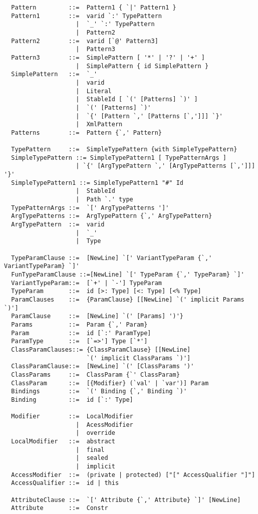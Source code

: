 \begin{lstlisting}
  Pattern         ::=  Pattern1 { `|' Pattern1 }
  Pattern1        ::=  varid `:' TypePattern
                    |  `_' `:' TypePattern
                    |  Pattern2
  Pattern2        ::=  varid [`@' Pattern3]
                    |  Pattern3
  Pattern3        ::=  SimplePattern [ '*' | '?' | '+' ]
                    |  SimplePattern { id SimplePattern }
  SimplePattern   ::=  `_'
                    |  varid
                    |  Literal
                    |  StableId [ `(' [Patterns] `)' ]
                    |  `(' [Patterns] `)'
                    |  `{' [Pattern `,' [Patterns [`,']]] `}'
                    |  XmlPattern
  Patterns        ::=  Pattern {`,' Pattern}

  TypePattern     ::=  SimpleTypePattern {with SimpleTypePattern}
  SimpleTypePattern ::= SimpleTypePattern1 [ TypePatternArgs ]
                    | `{' [ArgTypePattern `,' [ArgTypePatterns [`,']]] '}'
  SimpleTypePattern1 ::= SimpleTypePattern1 "#" Id
                    |  StableId 
                    |  Path `.' type 
  TypePatternArgs ::=  `[' ArgTypePatterns ']'
  ArgTypePatterns ::=  ArgTypePattern {`,' ArgTypePattern}
  ArgTypePattern  ::=  varid 
                    |  `_' 
                    |  Type

  TypeParamClause ::=  [NewLine] `[' VariantTypeParam {`,' VariantTypeParam} `]'
  FunTypeParamClause ::=[NewLine] `[' TypeParam {`,' TypeParam} `]'
  VariantTypeParam::=  [`+' | `-'] TypeParam
  TypeParam       ::=  id [>: Type] [<: Type] [<% Type]
  ParamClauses    ::=  {ParamClause} [[NewLine] `(' implicit Params `)']
  ParamClause     ::=  [NewLine] `(' [Params] ')'} 
  Params          ::=  Param {`,' Param}
  Param           ::=  id [`:' ParamType]
  ParamType       ::=  [`=>'] Type [`*']
  ClassParamClauses::= {ClassParamClause} [[NewLine] 
                       `(' implicit ClassParams `)']
  ClassParamClause::=  [NewLine] `(' [ClassParams ')'
  ClassParams     ::=  ClassParam {`' ClassParam}
  ClassParam      ::=  [{Modifier} (`val' | `var')] Param
  Bindings        ::=  `(' Binding {`,' Binding `)'
  Binding         ::=  id [`:' Type]

  Modifier        ::=  LocalModifier 
                    |  AcessModifier
                    |  override
  LocalModifier   ::=  abstract
                    |  final
                    |  sealed
                    |  implicit
  AccessModifier  ::=  (private | protected) ["[" AccessQualifier "]"]
  AccessQualifier ::=  id | this

  AttributeClause ::=  `[' Attribute {`,' Attribute} `]' [NewLine]
  Attribute       ::=  Constr


\end{lstlisting}

